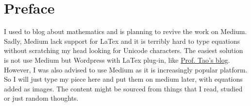 \chapter{Preface}
I used to blog about mathematics and is planning to revive the work on Medium. Sadly, Medium lack support for LaTex and it is terribly hard to type equations without scratching my head looking for Unicode characters. The easiest solution is not use Medium but Wordpress with LaTex plug-in, like \href{https://terrytao.wordpress.com/}{Prof. Tao's blog}. However, I was also advised to use Medium as it is increasingly popular platform. So I will just type my piece here and put them on medium later, with equations added as images. The content might be sourced from things that I read, studied or just random thoughts.